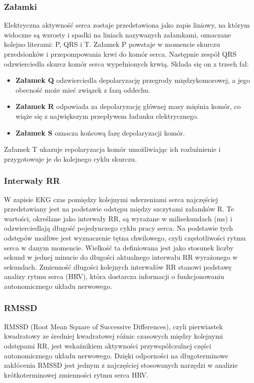 \documentclass{article}
\begin{document}
\subsubsection{Załamki}
Elektryczna aktywność serca zostaje przedstawiona jako zapis liniowy, na którym widoczne są wzrosty i spadki na liniach nazywanych załamkami, oznaczane kolejno literami: P, QRS i T. Załamek P powstaje w momencie skurczu przedsionków i przepompowania krwi do komór serca. Następnie zespół QRS odzwierciedla skurcz komór serca wypełnionych krwią. Składa się on z trzech fal:
\begin{itemize}
\item \textbf{Załamek Q} odzwierciedla depolaryzację przegrody międzykomorowej, a jego obecność może mieć związek z fazą oddechu. 
\item \textbf{Załamek R} odpowiada za depolaryzację głównej masy mięśnia komór, co wiąże się z największym przepływem ładunku elektrycznego.
\item \textbf {Załamek S} oznacza końcową fazę depolaryzacji komór.
\end{itemize}
Załamek T ukazuje repolaryzacja komór umożliwiając ich rozluźnienie i przygotowuje je do kolejnego cyklu skurczu.

\subsubsection{Interwały RR}
W zapisie EKG czas pomiędzy kolejnymi uderzeniami serca najczęściej przedstawiany jest na podstawie odstępu między szczytami załamków R. Te wartości, określane jako interwały RR, są wyrażane w milisekundach (ms) i odzwierciedlają długość pojedynczego cyklu pracy serca. Na podstawie tych odstępów możliwe jest wyznaczenie tętna chwilowego, czyli częstotliwości rytmu serca w danym momencie. Wielkość ta definiowana jest jako stosunek liczby sekund w jednej minucie do długości aktualnego interwału RR wyrażonego w sekundach. Zmienność długości kolejnych interwałów RR stanowi podstawę analizy rytmu serca (HRV), która dostarcza informacji o funkcjonowaniu autonomicznego układu nerwowego.

\subsubsection{RMSSD}
RMSSD (Root Mean Square of Successive Differences), czyli pierwiastek kwadratowy ze średniej kwadratowej różnic czasowych między kolejnymi odstępami RR, jest wskaźnikiem aktywności przywspółczulnej części autonomicznego układu nerwowego. Dzięki odporności na długoterminowe zakłócenia RMSSD jest jednym z najczęściej stosowanych narzędzi w analizie krótkoterminowej zmienności rytmu serca HRV.
\end{document}
